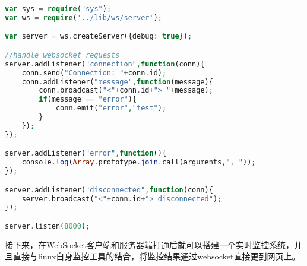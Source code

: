 \begin{lstlisting}[language=PHP]
var sys = require("sys");
var ws = require('../lib/ws/server');

var server = ws.createServer({debug: true});

//handle websocket requests
server.addListener("connection",function(conn){
	conn.send("Connection: "+conn.id);
	conn.addListener("message",function(message){
		conn.broadcast("<"+conn.id+"> "+message);
		if(message == "error"){
			conn.emit("error","test");
		}
	});
});

server.addListener("error",function(){
	console.log(Array.prototype.join.call(arguments,", "));
});

server.addListener("disconnected",function(conn){
	server.broadcast("<"+conn.id+"> disconnected");
});

server.listen(8000);
\end{lstlisting}

接下来，在WebSocket客户端和服务器端打通后就可以搭建一个实时监控系统，并且直接与linux自身监控工具的结合，将监控结果通过websocket直接更到网页上。

